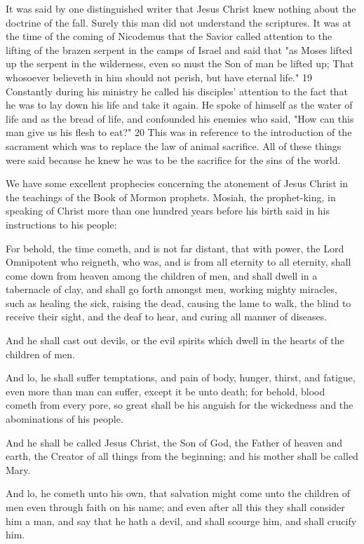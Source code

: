 It was said by one distinguished writer that Jesus Christ knew nothing about the doctrine of
the fall. Surely this man did not understand the scriptures. It was at the time of the coming of
Nicodemus that the Savior called attention to the lifting of the brazen serpent in the camps of
Israel and said that "as Moses lifted up the serpent in the wilderness, even so must the Son of
man be lifted up; That whosoever believeth in him should not perish, but have eternal life."
19 Constantly during his ministry he called his disciples' attention to the fact that he was to
lay down his life and take it again. He spoke of himself as the water of life and as the bread
of life, and confounded his enemies who said, "How can this man give us his flesh to eat?"
20 This was in reference to the introduction of the sacrament which was to replace the law of
animal sacrifice. All of these things were said because he knew he was to be the sacrifice for
the sins of the world.

We have some excellent prophecies concerning the atonement of Jesus Christ in the
teachings of the Book of Mormon prophets. Mosiah, the prophet-king, in speaking of Christ
more than one hundred years before his birth said in his instructions to his people:

For behold, the time cometh, and is not far distant, that with power, the Lord Omnipotent
who reigneth, who was, and is from all eternity to all eternity, shall come down from heaven
among the children of men, and shall dwell in a tabernacle of clay, and shall go forth
amongst men, working mighty miracles, such as healing the sick, raising the dead, causing
the lame to walk, the blind to receive their sight, and the deaf to hear, and curing all manner
of diseases.

And he shall cast out devils, or the evil spirits which dwell in the hearts of the children of
men.

And lo, he shall suffer temptations, and pain of body, hunger, thirst, and fatigue, even more
than man can suffer, except it be unto death; for behold, blood cometh from every pore, so
great shall be his anguish for the wickedness and the abominations of his people.

And he shall be called Jesus Christ, the Son of God, the Father of heaven and earth, the
Creator of all things from the beginning; and his mother shall be called Mary.

And lo, he cometh unto his own, that salvation might come unto the children of men even
through faith on his name; and even after all this they shall consider him a man, and say that
he hath a devil, and shall scourge him, and shall crucify him.

